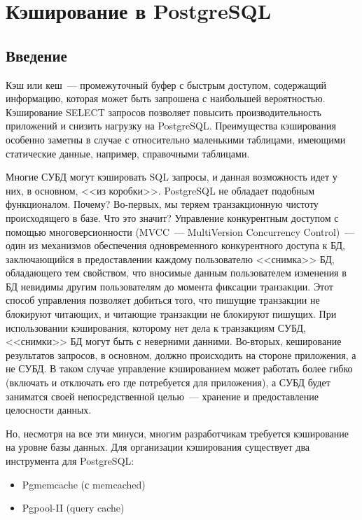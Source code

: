 \chapter{Кэширование в PostgreSQL}
\begin{epigraphs}
\end{epigraphs}
\section{Введение}
Кэш или кеш~--- промежуточный буфер с быстрым доступом, содержащий информацию, которая может быть запрошена с наибольшей вероятностью.
Кэширование SELECT запросов позволяет повысить производительность приложений и снизить нагрузку на PostgreSQL. 
Преимущества кэширования особенно заметны в случае с относительно маленькими таблицами, имеющими статические данные, 
например, справочными таблицами. 

Многие СУБД могут кэшировать SQL запросы, и данная возможность идет у них, в основном, <<из коробки>>. 
PostgreSQL не обладает подобным функционалом. Почему? 
Во-первых, мы теряем транзакционную чистоту происходящего в базе. Что это значит?
Управление конкурентным доступом с помощью многоверсионности (MVCC~--- MultiVersion Concurrency Control)~--- 
один из механизмов обеспечения одновременного конкурентного доступа к БД, заключающийся в предоставлении каждому 
пользователю <<снимка>> БД, обладающего тем свойством, что вносимые данным пользователем изменения в БД невидимы 
другим пользователям до момента фиксации транзакции. Этот способ управления позволяет добиться того, что пишущие 
транзакции не блокируют читающих, и читающие транзакции не блокируют пишущих. 
При использовании кэширования, которому нет дела к транзакциям СУБД, <<снимки>> БД могут быть с неверними данними.
Во-вторых, кеширование результатов запросов, в основном, должно происходить на стороне приложения, а не СУБД. 
В таком случае управление кэшированием может работать более гибко (включать и отключать его где потребуется для приложения), а 
СУБД будет заниматся своей непосредственной целью~--- хранение и предоставление целосности данных.

Но, несмотря на все эти минуси, многим разработчикам требуется кэширование на уровне базы данных. 
Для организации кэширования существует два инструмента для PostgreSQL:
\begin{itemize}
\item Pgmemcache (с memcached)
\item Pgpool-II (query cache)
\end{itemize}


